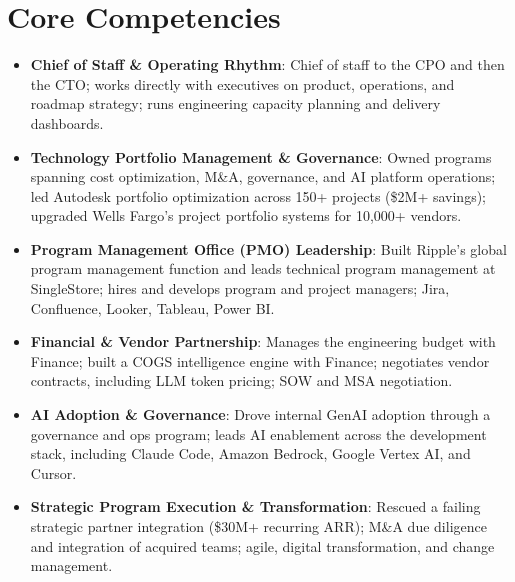 \documentclass[11pt,letterpaper,sans]{moderncv}
\begin{document}
\section{Core Competencies}
\vspace{1pt}
\begin{itemize}

\item \textbf{Chief of Staff \& Operating Rhythm}: Chief of staff to the CPO and then the CTO; works directly with executives on product, operations, and roadmap strategy; runs engineering capacity planning and delivery dashboards.

\item \textbf{Technology Portfolio Management \& Governance}: Owned programs spanning cost optimization, M\&A, governance, and AI platform operations; led Autodesk portfolio optimization across 150+ projects (\$2M+ savings); upgraded Wells Fargo's project portfolio systems for 10,000+ vendors.

\item \textbf{Program Management Office (PMO) Leadership}: Built Ripple's global program management function and leads technical program management at SingleStore; hires and develops program and project managers; Jira, Confluence, Looker, Tableau, Power BI.

\item \textbf{Financial \& Vendor Partnership}: Manages the engineering budget with Finance; built a COGS intelligence engine with Finance; negotiates vendor contracts, including LLM token pricing; SOW and MSA negotiation.

\item \textbf{AI Adoption \& Governance}: Drove internal GenAI adoption through a governance and ops program; leads AI enablement across the development stack, including Claude Code, Amazon Bedrock, Google Vertex AI, and Cursor.

\item \textbf{Strategic Program Execution \& Transformation}: Rescued a failing strategic partner integration (\$30M+ recurring ARR); M\&A due diligence and integration of acquired teams; agile, digital transformation, and change management.

\end{itemize}

\end{document}

